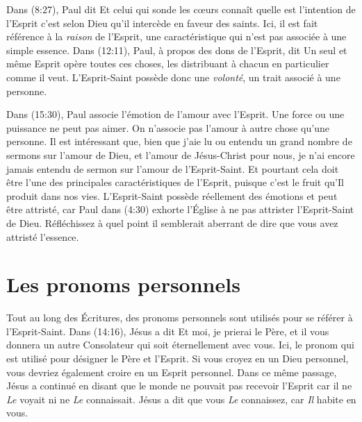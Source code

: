 Dans (8:27), Paul dit\frcolon{} \Og Et celui qui sonde les cœurs
 connaît quelle est l'intention de l'Esprit\frcolon{} c'est selon Dieu qu'il
 intercède en faveur des saints. \Fg{} Ici, il est fait référence
 à la \emph{raison} de l'Esprit, une caractéristique qui n'est pas associée à
 une simple essence. Dans (12:11), Paul, à propos des dons de
 l'Esprit, dit\frcolon{} \Og Un seul et même Esprit opère toutes ces choses, les
 distribuant à chacun en particulier comme il veut. \Fg{} L'Esprit-Saint
 possède donc une \emph{volonté}, un trait associé à une personne.

Dans (15:30), Paul associe l'émotion de l'amour avec l'Es\-prit.
 Une force ou une puissance ne peut pas aimer. On n'associe pas l'amour à autre
 chose qu'une personne. Il est intéressant que, bien que j'aie lu ou
 entendu un grand nombre de sermons sur l'amour de Dieu, et l'amour de
 Jésus-Christ pour nous, je n'ai encore jamais entendu de sermon sur l'amour de
 l'Esprit-Saint. Et pourtant cela doit être l'une des principales
 caractéristiques de l'Esprit, puisque c'est le fruit qu'Il produit dans nos
 vies.
 L'Esprit-Saint possède réellement des émotions et peut être attristé,
 car Paul dans (4:30) exhorte l'Église à ne pas attrister
 l'Esprit-Saint de Dieu. Réfléchissez à quel point il semblerait aberrant
 de dire que vous avez attristé l'essence.


\section{Les pronoms personnels}

Tout au long des Écritures, des pronoms personnels sont utilisés pour se
 référer à l'Esprit-Saint. Dans (14:16), Jésus a dit\frcolon{}
 \Og Et moi, je prierai le Père, et il vous donnera un autre Consolateur
 qui soit éternellement avec vous. \Fg{}
 Ici, le pronom \Og qui \Fg{} est utilisé pour désigner le Père et l'Esprit.
 Si vous croyez en un Dieu personnel, vous devriez également croire en
 un Esprit personnel. Dans ce même passage, Jésus a continué en disant
 que le monde ne pouvait pas recevoir l'Esprit car il ne \emph{Le} voyait ni
 ne \emph{Le} connaissait. Jésus a dit que vous \emph{Le} connaissez,
 car \emph{Il} habite en vous.

